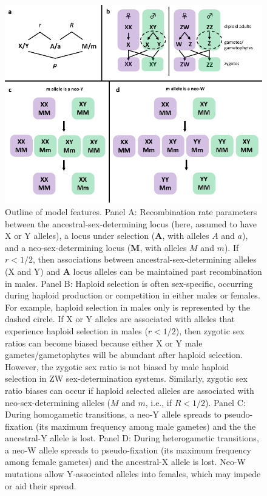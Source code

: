 \documentclass[12pt]{article}
\begin{document}
\begin{figure}[!h]
\centering
\centerline{\includegraphics[width=\linewidth]{Sex_determination_outline.pdf}}
\caption{
Outline of model features. 
Panel A: Recombination rate parameters between the ancestral-sex-determining locus (here, assumed to have X or Y alleles), a locus under selection (\textbf{A}, with alleles $A$ and $a$), and a neo-sex-determining locus (\textbf{M}, with alleles $M$ and $m$). If $r<1/2$, then associations between ancestral-sex-determining alleles (X and Y) and \textbf{A} locus alleles can be maintained past recombination in males. 
Panel B: Haploid selection is often sex-specific, occurring during haploid production or competition in either males or females. 
For example, haploid selection in males only is represented by the dashed circle.  
If X or Y alleles are associated with alleles that experience haploid selection in males ($r<1/2$), then zygotic sex ratios can become biased because either X or Y male gametes/gametophytes will be abundant after haploid selection. 
However, the zygotic sex ratio is not biased by male haploid selection in ZW sex-determination systems. 
Similarly, zygotic sex ratio biases can occur if haploid selected alleles are associated with neo-sex-determining alleles ($M$ and $m$, i.e., if $R<1/2$). 
Panel C: During homogametic transitions, a neo-Y allele spreads to pseudo-fixation (its maximum frequency among male gametes) and the the ancestral-Y allele is lost. 
Panel D: During heterogametic transitions, a neo-W allele spreads to pseudo-fixation (its maximum frequency among female gametes) and the ancestral-X allele is lost. Neo-W mutations allow Y-associated alleles into females, which may impede or aid their spread. 
}
\label{fig:model_outline}
\end{figure}
\end{document}

